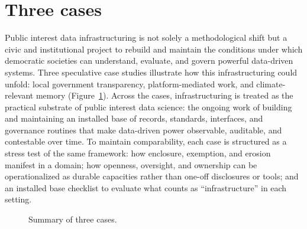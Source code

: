 \documentclass[acmsmall,screen]{acmart}
\begin{document}
\section*{Three cases}

Public interest data infrastructuring is not solely a methodological shift but a civic and institutional project to rebuild and maintain the conditions under which democratic societies can understand, evaluate, and govern powerful data-driven systems. Three speculative case studies illustrate how this infrastructuring could unfold: local government transparency, platform-mediated work, and climate-relevant memory (Figure~\ref{fig:three_cases}). Across the cases, infrastructuring is treated as the practical substrate of public interest data science: the ongoing work of building and maintaining an installed base of records, standards, interfaces, and governance routines that make data-driven power observable, auditable, and contestable over time. To maintain comparability, each case is structured as a stress test of the same framework: how enclosure, exemption, and erosion manifest in a domain; how openness, oversight, and ownership can be operationalized as durable capacities rather than one-off disclosures or tools; and an installed base checklist to evaluate what counts as ``infrastructure'' in each setting.

\begin{figure}
    \centering
    \caption{Summary of three cases.}
    \label{fig:three_cases}
\end{figure}
\end{document}
